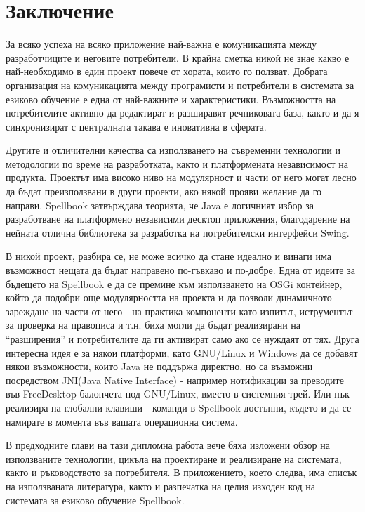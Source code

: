 \chapter*{Заключение}
За всяко успеха на всяко приложение най-важна е комуникацията между
разработчиците и неговите потребители. В крайна сметка никой не знае
какво е най-необходимо в един проект повече от хората, които го
ползват. Добрата организация на комуникацията между програмисти и
потребители в системата за езиково обучение е една от най-важните и
характеристики. Възможността на потребителите активно да редактират и
разширавят речниковата база, както и да я синхронизират с централната
такава е иновативна в сферата.

Другите и отличителни качества са използването на съвременни
технологии и методологии по време на разработката, както и
платформената независимост на продукта. Проектът има високо ниво на
модулярност и части от него могат лесно да бъдат преизползвани в други
проекти, ако някой прояви желание да го направи. Spellbook затвърждава
теорията, че Java е логичният избор за разработване на платформено
независими десктоп приложения, благодарение на нейната отлична
библиотека за разработка на потребителски интерфейси Swing.

В никой проект, разбира се, не може всичко да стане идеално и винаги
има възможност нещата да бъдат направено по-гъвкаво и по-добре. Една
от идеите за бъдещето на Spellbook е да се премине към използването на
OSGi контейнер, който да подобри още модулярността на проекта и да
позволи динамичното зареждане на части от него - на практика
компоненти като изпитът, иструментът за проверка на правописа и
т.н. биха могли да бъдат реализирани на "`разширения"' и потребителите
да ги активират само ако се нуждаят от тях. Друга интересна идея е за
някои платформи, като GNU/Linux и Windows да се добавят някои
възможности, които Java не поддържа директно, но са възможни
посредством JNI(Java Native Interface) - например нотификации за
преводите във FreeDesktop балончета под GNU/Linux, вместо в системния
трей. Или пък реализира на глобални клавиши - команди в Spellbook
достъпни, където и да се намирате в момента във вашата операционна
система. 

В предходните глави на тази дипломна работа вече бяха изложени обзор
на използваните технологии, цикъла на проектиране и реализиране на
системата, както и ръководството за потребителя. В приложението, което
следва, има списък на използваната литература, както и разпечатка на
целия изходен код на системата за езиково обучение Spellbook.
